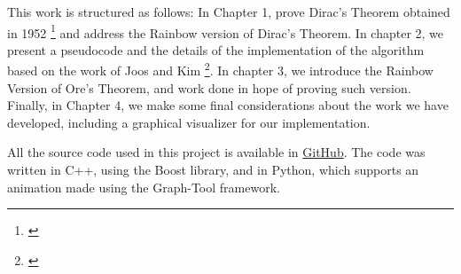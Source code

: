 This work is structured as follows: In Chapter 1, prove Dirac's Theorem obtained in 1952 \footnote{\cite{dirac1952}} and address the Rainbow version of Dirac's Theorem. In chapter 2, we present a pseudocode and the details of the implementation of the algorithm based on the work of Joos and Kim \footnote{\cite{Joos_2020}}. In chapter 3, we introduce the Rainbow Version of Ore's Theorem, and work done in hope of proving such version.
Finally, in Chapter 4, we make some final considerations about the work we have developed, including a graphical visualizer for our implementation.

All the source code used in this project is available in \href{https://github.com/wmrmrx/TCC}{GitHub}. The code was written in C++, using the Boost 
library, and in Python, which supports an animation made using the Graph-Tool framework.




